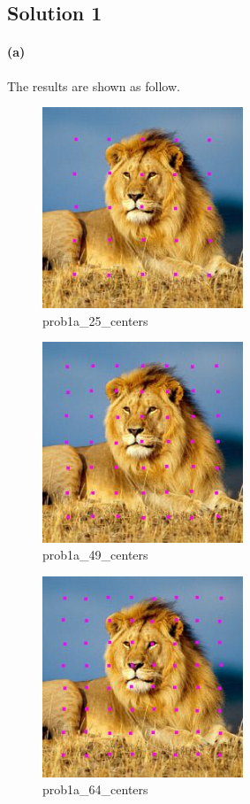 \documentclass{article}
\newcommand{\solution}[1]{\clearpage \subsection*{Solution #1}}
\newcommand{\spart}[1]{\paragraph{(#1)}}
\begin{document}

\solution{1} 

\spart{a} The results are shown as follow.
\begin{figure}[!h]
  \centering
  \includegraphics[height=6cm]{code/outputs/prob1a_25_centers.jpg}
  \caption{prob1a\_25\_centers}
\end{figure}
\begin{figure}[!h]
  \centering
  \includegraphics[height=6cm]{code/outputs/prob1a_49_centers.jpg}
  \caption{prob1a\_49\_centers}
\end{figure}
\begin{figure}[!h]
  \centering
  \includegraphics[height=6cm]{code/outputs/prob1a_64_centers.jpg}
  \caption{prob1a\_64\_centers}
\end{figure}
\end{document}
